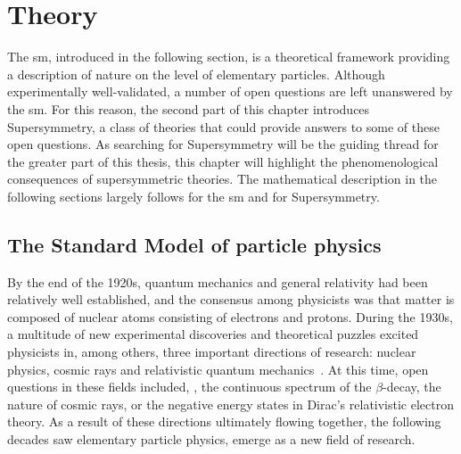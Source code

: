 
\chapter{Theory}

\ifpdf
    \graphicspath{{chapter-theory/Figs/Raster/}{chapter-theory/Figs/PDF/}{chapter-theory/Figs/}}
\else
    \graphicspath{{chapter-theory/Figs/Vector/}{chapter-theory/Figs/}}
\fi


The \gls{sm}, introduced in the following section, is a theoretical framework providing a description of nature on the level of elementary particles. Although experimentally well-validated, a number of open questions are left unanswered by the \gls{sm}.
For this reason, the second part of this chapter introduces Supersymmetry, a class of theories that could provide answers to some of these open questions. As searching for Supersymmetry will be the guiding thread for the greater part of this thesis, this chapter will highlight the phenomenological consequences of supersymmetric theories.
The mathematical description in the following sections largely follows \cite{Brock:1354959, Peskin:1995ev} for the \gls{sm} and \cite{Martin:1997ns,Bustamante:2009us} for Supersymmetry.

\section{The Standard Model of particle physics}

By the end of the 1920s, quantum mechanics and general relativity had been relatively well established, and the consensus among physicists was that matter is composed of nuclear atoms consisting of electrons and protons.
During the 1930s, a multitude of new experimental discoveries and theoretical puzzles excited physicists in, among others, three important directions of research: nuclear physics, cosmic rays and relativistic quantum mechanics~\cite{brown1986the}.
At this time, open questions in these fields included, \eg, the continuous spectrum of the $\beta$-decay, the nature of cosmic rays, or the negative energy states in Dirac's relativistic electron theory. As a result of these directions ultimately flowing together, the following decades saw elementary particle physics, emerge as a new field of research.

